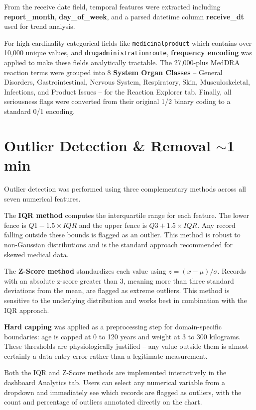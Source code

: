 \documentclass[12pt, letterpaper]{article}
\begin{document}
From the receive date field, temporal features were extracted including
\textbf{report\_month}, \textbf{day\_of\_week}, and a parsed datetime column
\textbf{receive\_dt} used for trend analysis.

For high-cardinality categorical fields like \texttt{medicinalproduct} which
contains over 10,000 unique values, and \texttt{drugadministrationroute},
\textbf{frequency encoding} was applied to make these fields analytically
tractable. The 27,000-plus MedDRA reaction terms were grouped into 8
\textbf{System Organ Classes} -- General Disorders, Gastrointestinal, Nervous
System, Respiratory, Skin, Musculoskeletal, Infections, and Product Issues --
for the Reaction Explorer tab. Finally, all seriousness flags were converted
from their original 1/2 binary coding to a standard 0/1 encoding.

\section{Outlier Detection \& Removal \hfill \textcolor{slidenumber}{\small $\sim$1 min}}

Outlier detection was performed using three complementary methods across all
seven numerical features.

The \textbf{IQR method} computes the interquartile range for each feature.
The lower fence is $Q1 - 1.5 \times IQR$ and the upper fence is
$Q3 + 1.5 \times IQR$. Any record falling outside these bounds is flagged as an
outlier. This method is robust to non-Gaussian distributions and is the
standard approach recommended for skewed medical data.

The \textbf{Z-Score method} standardizes each value using
$z = (x - \mu) / \sigma$. Records with an absolute z-score greater than 3,
meaning more than three standard deviations from the mean, are flagged as
extreme outliers. This method is sensitive to the underlying distribution and
works best in combination with the IQR approach.

\textbf{Hard capping} was applied as a preprocessing step for domain-specific
boundaries: age is capped at 0 to 120 years and weight at 3 to 300 kilograms.
These thresholds are physiologically justified -- any value outside them is
almost certainly a data entry error rather than a legitimate measurement.

Both the IQR and Z-Score methods are implemented interactively in the dashboard
Analytics tab. Users can select any numerical variable from a dropdown and
immediately see which records are flagged as outliers, with the count and
percentage of outliers annotated directly on the chart.
\end{document}
